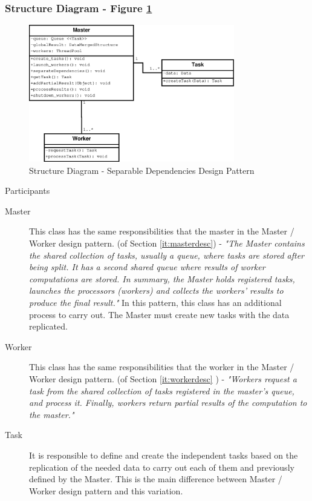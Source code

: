 \subsubsection{Structure Diagram - Figure \ref{fig:str_diagram_sd}}

\begin{figure}
	\centering
	\includegraphics*[width=0.8\textwidth, keepaspectratio=false]{fig/image21.eps}
	\caption{Structure Diagram - Separable Dependencies Design Pattern}
	\label{fig:str_diagram_sd}
\end{figure}


\begin{description}
	\item[Participants]
\end{description}

\begin{description}
	\item[Master]
	This class has the same responsibilities that the master in the Master / Worker design pattern. (of Section \ref{it:masterdesc}) -\textit{ "The Master contains the shared collection of tasks, usually a queue, where tasks are stored after being split. It has a second shared queue where results of worker computations are stored. In summary, the Master holds registered tasks, launches the processors (workers) and collects the workers' results to produce the final result."} In this pattern, this class has an additional process to carry out. The Master must create new tasks with the data replicated. 
	
	\item[Worker]
	This class has the same responsibilities that the worker in the Master / Worker design pattern. (of Section \ref{it:workerdesc} ) - \textit{ "Workers request a task from the shared collection of tasks registered in the master's queue, and process it. Finally, workers return partial results of the computation to the master."}
	
	\item[Task]
	It is responsible to define and create the independent tasks based on the replication of the needed data to carry out each of them and previously defined by the Master. This is the main difference between Master / Worker design pattern and this variation.
	
\end{description}

